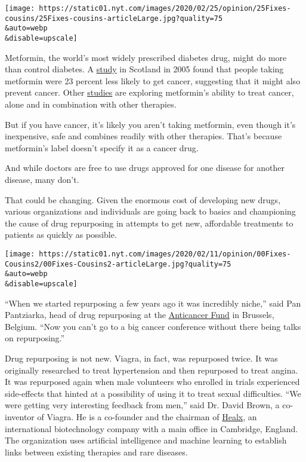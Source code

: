 \texttt{[image: https://static01.nyt.com/images/2020/02/25/opinion/25Fixes-cousins/25Fixes-cousins-articleLarge.jpg?quality=75\\\&auto=webp\\\&disable=upscale]}

Metformin, the world's most widely prescribed diabetes drug, might do
more than control diabetes. A
\href{https://www.ncbi.nlm.nih.gov/pmc/articles/PMC558205/?report=reader}{study}
in Scotland in 2005 found that people taking metformin were 23 percent
less likely to get cancer, suggesting that it might also prevent cancer.
Other
\href{https://www.cancer.gov/about-cancer/treatment/clinical-trials/intervention/metformin-hydrochloride}{studies}
are exploring metformin's ability to treat cancer, alone and in
combination with other therapies.

But if you have cancer, it's likely you aren't taking metformin, even
though it's inexpensive, safe and combines readily with other therapies.
That's because metformin's label doesn't specify it as a cancer drug.

And while doctors are free to use drugs approved for one disease for
another disease, many don't.

That could be changing. Given the enormous cost of developing new drugs,
various organizations and individuals are going back to basics and
championing the cause of drug repurposing in attempts to get new,
affordable treatments to patients as quickly as possible.

\texttt{[image: https://static01.nyt.com/images/2020/02/11/opinion/00Fixes-Cousins2/00Fixes-Cousins2-articleLarge.jpg?quality=75\\\&auto=webp\\\&disable=upscale]}

``When we started repurposing a few years ago it was incredibly niche,''
said Pan Pantziarka, head of drug repurposing at the
\href{https://www.anticancerfund.org/}{Anticancer Fund} in Brussels,
Belgium. ``Now you can't go to a big cancer conference without there
being talks on repurposing.''

Drug repurposing is not new. Viagra, in fact, was repurposed twice. It
was originally researched to treat hypertension and then repurposed to
treat angina. It was repurposed again when male volunteers who enrolled
in trials experienced side-effects that hinted at a possibility of using
it to treat sexual difficulties. ``We were getting very interesting
feedback from men,'' said Dr. David Brown, a co-inventor of Viagra. He
is a co-founder and the chairman of \href{https://healx.io/}{Healx}, an
international biotechnology company with a main office in Cambridge,
England. The organization uses artificial intelligence and machine
learning to establish links between existing therapies and rare
diseases.

